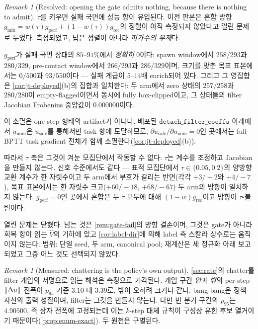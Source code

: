\documentclass[11pt]{article}
\theoremstyle{plain}
\theoremstyle{definition}
\theoremstyle{remark}
\newtheorem{remark}[theorem]{Remark}
\DeclarePairedDelimiter{\norm}{\lVert}{\rVert}
\newcommand{\Vhat}{\widehat V}
\begin{document}
\begin{remark}[Resolved: opening the gate admits nothing, because there is nothing to admit]\label{rem:gate-open}
$\tau$를 키우면 실패 국면에 성능 항이 유입된다. 이전 판본은 혼합 방향
$g_{\mathrm{mix}}=w(\tau)g_{\mathrm{perf}}+(1-w(\tau))g_{\mathrm{rec}}$의 정렬이 아직 측정되지
않았다고 열린 문제로 두었다. 측정되었고, 답은 정렬이 아니라 \emph{피가수의 부재}다.

$g_{\mathrm{perf}}$가 실패 국면 상태의 $85$--$91\%$에서 \emph{정확히} $0$이다: spawn window에서
$258/293$과 $280/329$, pre-contact window에서 $266/293$과 $286/329$이며, 크기를 맞춘 목표
표본에서는 $0/500$과 $93/550$이다 --- 실패 계급이 $5$--$14$배 enrich되어 있다. 그리고 그
영집합은 \cref{cor:jt-deployed}(b)의 집합과 일치한다: 두 arm에서 zero 상태의
$257/258$과 $280/280$이 empty-flagged이면서 동시에 fully box-clipped이고, 그 상태들의
filter Jacobian Frobenius 중앙값이 $0.000000$이다.

이 소멸은 one-step 형태의 artifact가 아니다. 배포된 $\texttt{detach\_filter\_coeffs}$ 아래에서
$u_{\mathrm{nom}}$은 $u_{\mathrm{safe}}$를 통해서만 task 항에 도달하므로,
$\partial u_{\mathrm{safe}}/\partial u_{\mathrm{nom}}=0$인 곳에서는 full-BPTT task gradient
전체가 함께 소멸한다(\cref{cor:jt-deployed}(b)).

따라서 $\tau$ 축은 그것이 겨눈 모집단에서 작동할 수 없다: $\tau$는 계수를 조정하고 Jacobian을
만들지 않는다. 신호 수준에서도 같다 --- 표적 모집단에서 $\tau\in\{0.05,0.2\}$의 양방향 교환
계수가 한 자릿수이고 두 arm에서 부호가 갈리는 반면(각각 $+3/-2$와 $+4/-7$), 목표 표본에서는
한 자릿수 크고($+60/-18$, $+68/-67$) 두 arm의 방향이 일치하지 않는다. $g_{\mathrm{perf}}=0$인
곳에서 혼합은 두 $\tau$ 모두에 대해 $(1-w)g_{\mathrm{rec}}$이고 방향이 $\tau$-불변이다.

열린 문제는 닫혔다. 남는 것은 \cref{rem:gate-fail}의 방향 결손이며, 그것은 gate가 아니라
회복 항이 읽는 $\Vhat$의 기하에 있고 \cref{cor:label-dir}에 의해 label 측 스칼라 상수로는
움직이지 않는다. 범위: 단일 seed, 두 arm, canonical pool; 재계산은 세 정규화 아래 보고되었고
그중 어느 것도 선택되지 않았다.
\end{remark}

\begin{remark}[Measured: chattering is the policy's own output]\label{rem:chatter-src}
\cref{sec:rate}의 chatter를 filter 개입의 서명으로 읽는 해석은 측정으로 기각된다. 개입 구간
\emph{안}과 \emph{밖}의 per-step $\norm{\Delta u}$ 진폭이 $p_{95}$ 기준 $3.10$ 대 $3.39$로, 밖이
오히려 크거나 같다. bang-bang은 정책 자신의 출력 성질이며, filter는 그것을 만들지 않는다.
다만 빈 분기 구간의 $p_{95}$는 $4.90500$, 즉 상자 전폭에 고정되는데 이는 $k$-step 대체 규칙이
구성상 유한 후보 열거이기 때문이다(\cref{prop:enum-exact}). 두 원천은 구별된다.
\end{remark}
\end{document}
